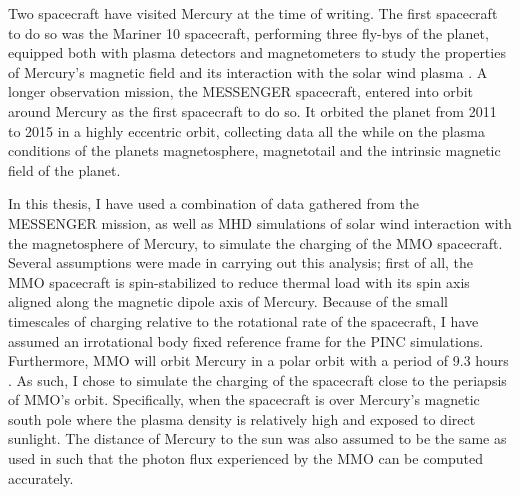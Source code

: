 Two spacecraft have visited Mercury at the time of writing. The first spacecraft to do so was the Mariner 10 spacecraft, performing three fly-bys of the planet, equipped both with plasma detectors and magnetometers to study the properties of Mercury's magnetic field and its interaction with the solar wind plasma . A longer observation mission, the MESSENGER spacecraft, entered into orbit around Mercury as the first spacecraft to do so. It orbited the planet from 2011 to 2015 in a highly eccentric orbit, collecting data all the while on the plasma conditions of the planets magnetosphere, magnetotail and the intrinsic magnetic field of the planet.

In this thesis, I have used a combination of data gathered from the MESSENGER mission, as well as MHD simulations of solar wind interaction with the magnetosphere of Mercury, to simulate the charging of the MMO spacecraft. Several assumptions were made in carrying out this analysis; first of all, the MMO spacecraft is spin-stabilized \parencite{Yamakawa2008} to reduce thermal load with its spin axis aligned along the magnetic dipole axis of Mercury. Because of the small timescales of charging relative to the rotational rate of the spacecraft, I have assumed an irrotational body fixed reference frame for the PINC simulations. Furthermore, MMO will orbit Mercury in a polar orbit with a period of 9.3 hours . As such, I chose to simulate the charging of the spacecraft close to the periapsis of MMO's orbit. Specifically, when the spacecraft is over Mercury's magnetic south pole where the plasma density is relatively high and exposed to direct sunlight. The distance of Mercury to the sun was also assumed to be the same as used in \parencite{Benna2009} such that the photon flux experienced by the MMO can be computed accurately. 


